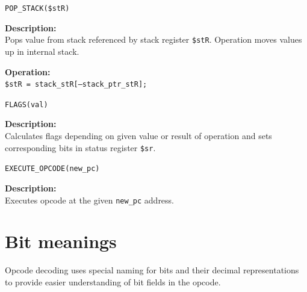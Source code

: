 \documentclass[oneside,english,a4paper,10pt,oneside,openany,final]{memoir}
\newcommand{\Code}[1]{\texttt{#1}}
\newcommand{\Function}[1]{\texttt{#1}}
\newcommand{\Register}[1]{\texttt{#1}}
\newcommand{\Variable}[1]{\texttt{#1}}
\begin{document}
\begin{description}
  \item \Function{POP\_STACK(\$stR)}
  \begin{description}
	\item \textbf{Description:} \\
      Pops value from stack referenced by stack register \Register{\$stR}. Operation moves values up in internal stack.

    \item \textbf{Operation:} \\
      \Code{\$stR = stack\_stR[--stack\_ptr\_stR];}
  \end{description}
\end{description}

\begin{description}
  \item \Function{FLAGS(val)}
  \begin{description}
    \item\textbf{Description:} \\
      Calculates flags depending on given value or result of operation and sets corresponding bits in status register \Register{\$sr}.
  \end{description}
\end{description}

\begin{description}
  \item \Function{EXECUTE\_OPCODE(new\_pc)}
  \begin{description}
    \item \textbf{Description:} \\
      Executes opcode at the given \Variable{new\_pc} address.
  \end{description}
\end{description}

\pagebreak{}

\section{Bit meanings}

Opcode decoding uses special naming for bits and their decimal representations to provide easier understanding of bit fields in the opcode.
\end{document}
